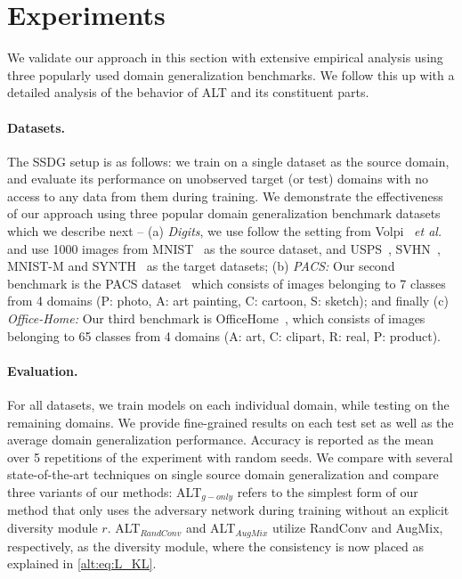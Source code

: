 \section{Experiments}


We validate our approach in this section with extensive empirical analysis using three popularly used domain generalization benchmarks. We follow this up with a detailed analysis of the behavior of ALT and its constituent parts. 


\paragraph{Datasets.}
The SSDG setup is as follows: we train on a single dataset as the source domain, and evaluate its performance on unobserved target (or test) domains with no access to any data from them during training. We demonstrate the effectiveness of our approach using three popular domain generalization benchmark datasets which we describe next -- (a) \textit{Digits}, we use follow the setting from Volpi~ \textit{et al.}~\citep{volpi2018generalizing} and use 1000 images from MNIST~\citep{lecun1998mnist} as the source dataset, and USPS~\citep{denker1988neural}, SVHN~\citep{netzer2011reading}, MNIST-M and SYNTH~\citep{ganin2015unsupervised} as the target datasets; (b) \textit{PACS:} Our second benchmark is the PACS dataset~\citep{li2017deeper} which consists of images belonging to 7 classes from 4 domains (P: photo, A: art painting, C: cartoon, S: sketch); and finally (c) \textit{Office-Home:} Our third benchmark is OfficeHome~\citep{venkateswara2017deep}, which consists of images belonging to 65 classes from 4 domains (A: art, C: clipart, R: real, P: product). 

\paragraph{Evaluation.}
For all datasets, we train models on each individual domain, while testing on the remaining domains. We provide fine-grained results on each test set as well as the average domain generalization performance. Accuracy is reported as the mean over 5 repetitions of the experiment with random seeds. We compare with several state-of-the-art techniques on single source domain generalization and compare three variants of our methods: ALT$_{g-only}$ refers to the simplest form of our method that only uses the adversary network during training without an explicit diversity module $r$. ALT$_{RandConv}$ and ALT$_{AugMix}$ utilize RandConv and AugMix, respectively, as the diversity module, where the consistency is now placed 
as explained in \eqref{alt:eq:L_KL}.


